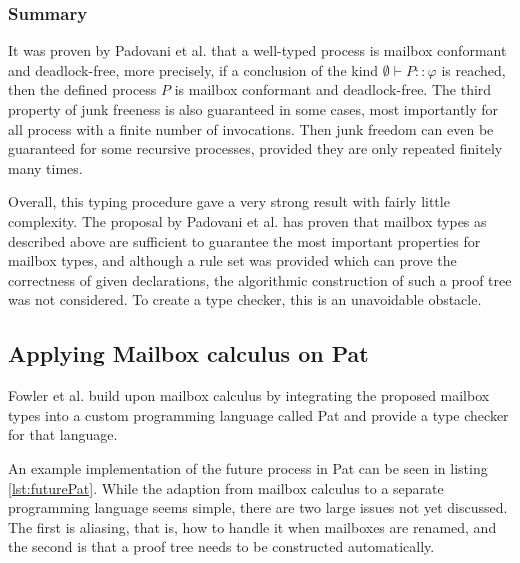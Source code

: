 \subsubsection{Summary}

It was proven by Padovani et al.\cite{deliguoroMailboxTypesUnordered2018} that a well-typed process is mailbox conformant and deadlock-free, more precisely, if a conclusion of the kind $\emptyset \vdash P :: \varphi$ is reached, then the defined process $P$ is mailbox conformant and deadlock-free. The third property of junk freeness is also guaranteed in some cases, most importantly for all process with a finite number of invocations. Then junk freedom can even be guaranteed for some recursive processes, provided they are only repeated finitely many times.

Overall, this typing procedure gave a very strong result with fairly little complexity. The proposal by Padovani et al.\cite{deliguoroMailboxTypesUnordered2018} has proven that mailbox types as described above are sufficient to guarantee the most important properties for mailbox types, and although a rule set was provided which can prove the correctness of given declarations, the algorithmic construction of such a proof tree was not considered. To create a type checker, this is an unavoidable obstacle. 


\subsection{Applying Mailbox calculus on Pat}



Fowler et al.\cite{fowlerSpecialDeliveryProgramming2023} build upon mailbox calculus by integrating the proposed mailbox types into a custom programming language called Pat and provide a type checker\cite{fowlerPatCheckerGithub2025} for that language. 



An example implementation of the future process in Pat can be seen in listing \ref{lst:futurePat}. While the adaption from mailbox calculus to a separate programming language seems simple, there are two large issues not yet discussed. The first is aliasing, that is, how to handle it when mailboxes are renamed, and the second is that a proof tree needs to be constructed automatically.

